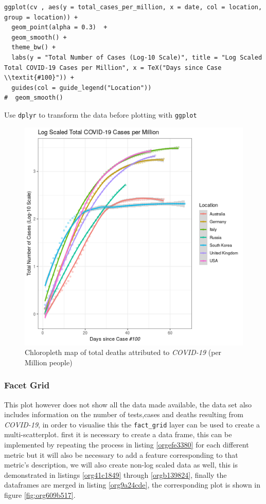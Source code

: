 \documentclass[11pt]{article}
\begin{document}
\begin{listing}[htbp]
\begin{verbatim}
ggplot(cv , aes(y = total_cases_per_million, x = date, col = location, group = location)) +
  geom_point(alpha = 0.3)  +
  geom_smooth() +
  theme_bw() +
  labs(y = "Total Number of Cases (Log-10 Scale)", title = "Log Scaled Total COVID-19 Cases per Million", x = TeX("Days since Case \\textit{#100}")) +
  guides(col = guide_legend("Location"))
#  geom_smooth()
\end{verbatim}
\caption{\label{orgba8ada1}Use \texttt{dplyr} to transform the data before plotting with \texttt{ggplot}}
\end{listing}


\begin{figure}[htbp]
\centering
\includegraphics[width=12cm]{FirstTS.png}
\caption{\label{fig:org765f863}Chloropleth map of total deaths attributed to \emph{COVID-19} (per Million people)}
\end{figure}

\subsubsection{Facet Grid}
\label{sec:org2b4d7f4}
This plot however does not show all the data made available, the data set also
includes information on the number of tests,cases and deaths resulting from
\emph{COVID-19}, in order to visualise this the \texttt{fact\_grid} layer can be used to
create a multi-scatterplot. first it is necessary to create a data frame, this
can be implemented by repeating the process in listing \ref{orgefe3380} for each different
metric but it will also be necessary to add a feature corresponding to that
metric's description, we will also create non-log scaled data as well, this is
demonstrated in listings \ref{org41c1849} through \ref{orgb139824}, finally the dataframes are merged
in listing \ref{org9a24cde}, the corresponding plot is shown in figure \ref{fig:org609b517}.
\end{document}

